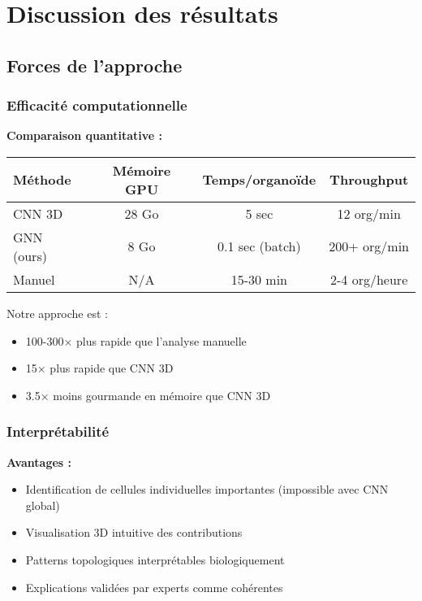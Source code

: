 \section{Discussion des résultats}

\subsection{Forces de l'approche}

\subsubsection{Efficacité computationnelle}

\textbf{Comparaison quantitative :}

\begin{center}
\begin{tabular}{|l|c|c|c|}
\hline
\textbf{Méthode} & \textbf{Mémoire GPU} & \textbf{Temps/organoïde} & \textbf{Throughput} \\
\hline
CNN 3D & 28 Go & 5 sec & 12 org/min \\
GNN (ours) & 8 Go & 0.1 sec (batch) & 200+ org/min \\
Manuel & N/A & 15-30 min & 2-4 org/heure \\
\hline
\end{tabular}
\end{center}

Notre approche est :
\begin{itemize}
    \item 100-300× plus rapide que l'analyse manuelle
    \item 15× plus rapide que CNN 3D
    \item 3.5× moins gourmande en mémoire que CNN 3D
\end{itemize}

\subsubsection{Interprétabilité}

\textbf{Avantages :}
\begin{itemize}
    \item Identification de cellules individuelles importantes (impossible avec CNN global)
    \item Visualisation 3D intuitive des contributions
    \item Patterns topologiques interprétables biologiquement
    \item Explications validées par experts comme cohérentes
\end{itemize}

